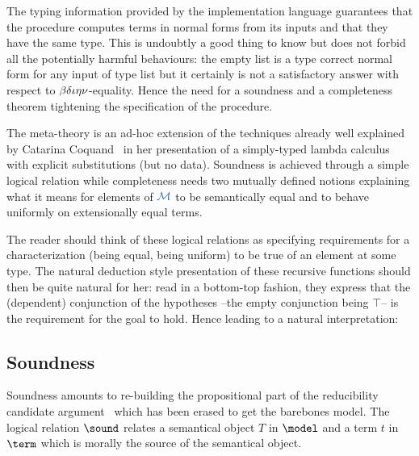 The typing information provided by the implementation language guarantees that
the procedure computes terms in normal forms from its inputs and that they have
the same type. This is undoubtly a good thing to know but does not forbid all
the potentially harmful behaviours: the empty list is a type correct normal form
for any input of type list but it certainly is not a satisfactory answer with
respect to $\rules$-equality. Hence the need for a soundness and a completeness
theorem tightening the specification of the procedure.

The meta-theory is an ad-hoc extension of the techniques already well explained
by Catarina Coquand~\cite{Coquand02} in her presentation of a simply-typed lambda
calculus with explicit substitutions (but no data). Soundness is achieved through
a simple logical relation while completeness needs two mutually defined notions
explaining what it means for elements of $\NBE$ to be semantically equal and to
behave uniformly on extensionally equal terms.

The reader should think of these logical relations as specifying requirements for
a characterization (being equal, being uniform) to be true of an element at some
type. The natural deduction style presentation of these recursive functions should
then be quite natural for her: read in a bottom-top fashion, they express that
the (dependent) conjunction of the hypotheses --the empty conjunction being $\top$--
is the requirement for the goal to hold. Hence leading to a natural interpretation:
\begin{mathpar}\end{mathpar}



\subsection{Soundness}

Soundness amounts to re-building the propositional part of the reducibility
candidate argument~\cite{Girard06} which has been erased to get the barebones
model. The logical relation $\sound$ relates a semantical object $T$ in $\model$
and a term $t$ in $\term$ which is morally the source of the semantical object.

